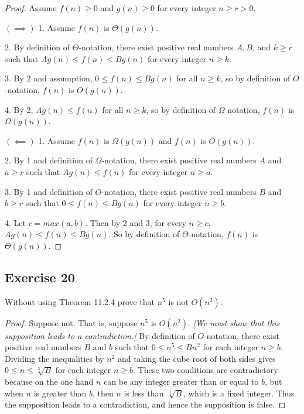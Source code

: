 \documentclass[14pt]{extarticle}
\begin{document}
\begin{proof}
    Assume \(f(n) \geq 0\) and \(g(n) \geq 0\) for every integer \(n \geq r > 0\).

    \(\bm{(\implies)}\) 1. Assume \(f(n)\) is \(\Theta(g(n))\).

    2. By definition of \(\Theta\)-notation, there exist positive real numbers \(A, B\), and \(k \geq r\) such that \(A g(n)
    \leq f(n) \leq B g(n)\) for every integer \(n \geq k\).

    3. By 2 and assumption, \(0 \leq f(n) \leq Bg(n)\) for all \(n \geq k\), so by definition of \(O\)-notation, \(f(n)\) is
    \(O(g(n))\).

    4. By 2, \(Ag(n) \leq f(n)\) for all \(n \geq k\), so by definition of \(\Omega\)-notation, \(f(n)\) is \(\Omega(g(n))\).

    \(\bm{(\impliedby)}\) 1. Assume \(f(n)\) is \(\Omega(g(n))\) and \(f(n)\) is \(O(g(n))\).

    2. By 1 and definition of \(\Omega\)-notation, there exist positive real numbers \(A\) and \(a \geq r\) such that
    \(Ag(n) \leq f(n)\) for every integer \(n \geq a\).

    3. By 1 and definition of \(O\)-notation, there exist positive real numbers \(B\) and \(b \geq r\) such that
    \(0 \leq f(n) \leq Bg(n)\) for every integer \(n \geq b\).

    4. Let \(c = max(a,b)\). Then by 2 and 3, for every \(n \geq c\), \(Ag(n) \leq f(n) \leq Bg(n)\). So by definition of
    \(\Theta\)-notation, \(f(n)\) is \(\Theta(g(n))\).
\end{proof}

\subsection{Exercise 20}
Without using Theorem 11.2.4 prove that \(n^5\) is not \(O(n^2)\).

\begin{proof}
    Suppose not. That is, suppose \(n^5\) is \(O(n^2)\). {\it [We must show that this supposition leads to a contradiction.]} By
    definition of \(O\)-notation, there exist positive real numbers \(B\) and \(b\) such that \(0 \leq n^5 \leq Bn^2\) for
    each integer \(n \geq b\). Dividing the inequalities by \(n^2\) and taking the cube root of both sides gives
    \(0 \leq n \leq \sqrt[3]{B}\) for each integer \(n \geq b\). These two conditions are contradictory because on the one hand
    \(n\) can be any integer greater than or equal to \(b\), but when \(n\) is greater than \(b\), then \(n\) is less than
    \(\sqrt[3]{B}\), which is a fixed integer. Thus the supposition leads to a contradiction, and hence the
    supposition is false.
\end{proof}
\end{document}
